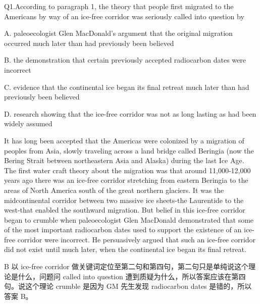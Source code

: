 \begin{blk}
    \begin{qst}
        Q1.According to paragraph 1, the theory that people first migrated to the Americans by way of an ice-free corridor was seriously called into question by
    \end{qst}

    \begin{chc}
        A. paleoecologist Glen MacDonald's argument that the original migration occurred much later than had previously been believed

        B. the demonstration that certain previously accepted radiocarbon dates were incorrect

        C. evidence that the continental ice began its final retreat much later than had previously been believed

        D. research showing that the ice-free corridor was not as long lasting as had been widely assumed
    \end{chc}

    \begin{psgq}
        It has long been accepted that the Americas were colonized by a migration of peoples from Asia, slowly traveling across a land bridge called Beringia (now the Bering Strait between northeastern Asia and Alaska) during the last Ice Age. The first water craft theory about the migration was that around 11,000-12,000 years ago there was an ice-free corridor stretching from eastern Beringia to the areas of North America south of the great northern glaciers. It was the midcontinental corridor between two massive ice sheets-the Laurentide to the west-that enabled the southward migration. But belief in this ice-free corridor began to crumble when paleoecologist Glen MacDonald demonstrated that some of the most important radiocarbon dates used to support the existence of an ice-free corridor were incorrect. He persuasively argued that such an ice-free corridor did not exist until much later, when the continental ice began its final retreat.
    \end{psgq}

    \begin{nlz}
        B 以 ice-free corridor 做关键词定位至第二句和第四句，第二句只是单纯说这个理论是什么，问题问 called into question 遭到质疑为什么，所以答案应该在第四句。说这个理论 crumble 是因为 GM 先生发现 radiocarbon dates 是错的，所以答案 B。
    \end{nlz}
\end{blk}

